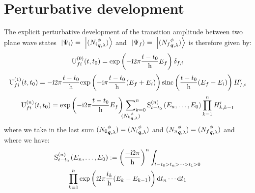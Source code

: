 \section{Perturbative development}

The explicit perturbative development of the transition amplitude between two plane wave states $\ket{\Psi_i} = \ket{\bFQ {N_i} \pt \q \sp}$ and $\ket{\Psi_f} = \ket{\bFQ {N_f} \pt \q \sp}$ is therefore given by:
\begin{equation*}
\Umn f i 0 t {t_0} = \exp{-\i 2 \pi \frac{t - t_0} \h E_f} \delta_{f,i}
\end{equation*}
\begin{equation*}
\Umn f i 1 t {t_0} = -\i 2 \pi \frac{t - t_0} \h \exp{-\i \pi \frac{t - t_0} \h ( E_f + E_i )} \sinc{\frac{t - t_0} \h ( E_f - E_i )} H'_{f,i}
\end{equation*}
\begin{equation*}
\Umn f i n t {t_0} = \exp{-\i 2 \pi \frac{t - t_0} \h E_f} \sideset{}{_{k=0}^n}\sum_{\bFQ {N_k} \pt \q \sp} \SmE n {E_n, \dotsc, E_0} \prod_{k=1}^n H'_{k,k-1}
\end{equation*}
where we take in the last sum $\bFQ {N_0} \pt \q \sp = \bFQ {N_i} \pt \q \sp$ and $\bFQ {N_n} \pt \q \sp = \bFQ {N_f} \pt \q \sp$ and where we have:
\begin{multline*}
\SmE n {E_n, \dotsc, E_0} \eqdef \left( \frac{-\i 2 \pi} \h \right)^n \int_{t - t_0 > t_n > \dotsb > t_1 > 0} \\
\prod_{k=1}^n \exp{\i 2 \pi \frac{t_k} \h ( E_k - E_{k - 1} )} \dt_n \dotsm \dt_1
\end{multline*}

